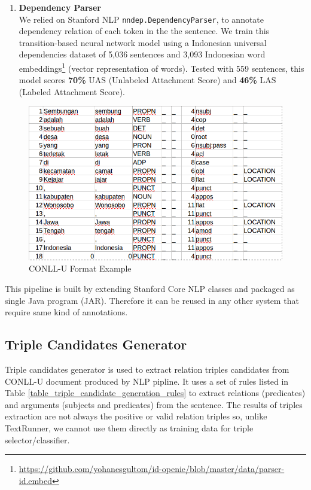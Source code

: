 \documentclass[conference,compsoc]{IEEEtran}
\begin{document}
\begin{enumerate}
\item \textbf{Dependency Parser} \\

We relied on Stanford NLP \verb|nndep.DependencyParser|\cite{chen2014fast}, to annotate dependency relation of each token in the the sentence. We train this transition-based neural network model using a Indonesian universal dependencies dataset of 5,036 sentences and 3,093 Indonesian word embeddings\footnote{\url{https://github.com/yohanesgultom/id-openie/blob/master/data/parser-id.embed}} (vector representation of words). Tested with 559 sentences, this model scores \textbf{70\%} UAS (Unlabeled Attachment Score) and \textbf{46\%} LAS (Labeled Attachment Score).


\end{enumerate}

\begin{figure}
\centering
\includegraphics[scale=0.35]{conllu_example}
\caption{CONLL-U Format Example}
\label{fig_conllu_example}
\end{figure}

This pipeline is built by extending Stanford Core NLP classes and packaged as single Java program (JAR). Therefore it can be reused in any other system that require same kind of annotations.

\subsection{Triple Candidates Generator} \label{Triple Candidates Generator}


Triple candidates generator is used to extract relation triples candidates from CONLL-U document produced by NLP pipline. It uses a set of rules listed in Table \ref{table_triple_candidate_generation_rules} to extract relations (predicates) and arguments (subjects and predicates) from the sentence. The results of triples extraction are not always the positive or valid relation triples so, unlike TextRunner\cite{banko2007open}, we cannot use them directly as training data for triple selector/classifier.
\end{document}
